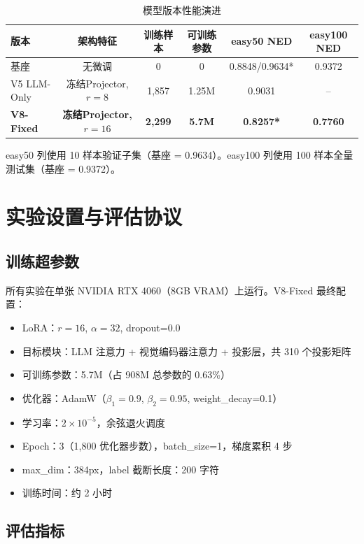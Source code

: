 \begin{table}[h]
\centering
\caption{模型版本性能演进}
\label{tab:evolution}
\begin{tabular}{lccccc}
\toprule
\textbf{版本} & \textbf{架构特征} & \textbf{训练样本} & \textbf{可训练参数} & \textbf{easy50 NED} & \textbf{easy100 NED} \\
\midrule
基座       & 无微调        & 0      & 0       & 0.8848/0.9634* & 0.9372 \\
V5 LLM-Only & 冻结Projector, $r=8$ & 1,857 & 1.25M & 0.9031 & -- \\
\textbf{V8-Fixed} & \textbf{冻结Projector, $r=16$} & \textbf{2,299} & \textbf{5.7M} & \textbf{0.8257*} & \textbf{0.7760} \\
\bottomrule
\end{tabular}
\par\smallskip
{\small\noindent *easy50 列使用 10 样本验证子集（基座 = 0.9634）。easy100 列使用 100 样本全量测试集（基座 = 0.9372）。}
\end{table}


\section{实验设置与评估协议}

\subsection{训练超参数}

所有实验在单张 NVIDIA RTX 4060（8GB VRAM）上运行。V8-Fixed 最终配置：

\begin{itemize}[nosep]
    \item LoRA：$r=16$, $\alpha=32$, dropout=0.0
    \item 目标模块：LLM 注意力 + 视觉编码器注意力 + 投影层，共 310 个投影矩阵
    \item 可训练参数：5.7M（占 908M 总参数的 0.63\%）
    \item 优化器：AdamW（$\beta_1=0.9$, $\beta_2=0.95$, weight\_decay=0.1）
    \item 学习率：$2\times10^{-5}$，余弦退火调度
    \item Epoch：3（1,800 优化器步数），batch\_size=1，梯度累积 4 步
    \item max\_dim：384px，label 截断长度：200 字符
    \item 训练时间：约 2 小时
\end{itemize}

\subsection{评估指标}

